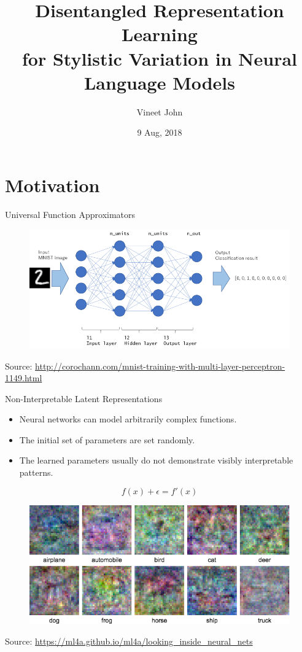\documentclass[aspectratio=169]{beamer}
\title{
	Disentangled Representation Learning\\
	for Stylistic Variation in Neural Language Models}
\date{9 Aug, 2018}
\author{Vineet John}
\institute{University of Waterloo}
\newcommand{\imgsrc}[1]{\tiny{Source: #1}}
\begin{document}
\maketitle
\graphicspath{{images/}}

\section{Motivation}

\begin{frame}{Universal Function Approximators}
	\centering
	\begin{figure}[ht]
		\includegraphics[width=\linewidth]{mlp-network}
	\end{figure}
	\imgsrc{\url{http://corochann.com/mnist-training-with-multi-layer-perceptron-1149.html}}
\end{frame}

\begin{frame}{Non-Interpretable Latent Representations}
	\begin{itemize}
		\item Neural networks can model arbitrarily complex functions.
		\item The initial set of parameters are set randomly.
		\item The learned parameters usually do not demonstrate visibly interpretable patterns.
	\end{itemize}
	$$f(x) + \epsilon = f'(x)$$
	\centering
	\begin{figure}[ht]
		\includegraphics[width=0.5\linewidth]{uninterpretable-weights}
	\end{figure}
	\imgsrc{\url{https://ml4a.github.io/ml4a/looking_inside_neural_nets}}
\end{frame}
\end{document}
